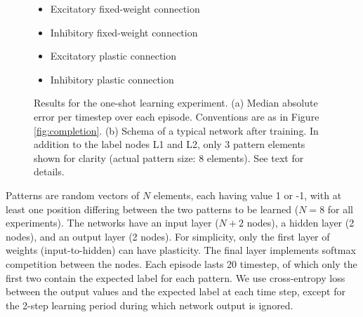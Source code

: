 \documentclass{article}
\begin{document}
\begin{figure}[b]
\begin{subfigure}[t]{0.4\textwidth}
\end{subfigure}
\begin{minipage}[b]{0.2\textwidth}
\noindent
\small
\begin{itemize}[leftmargin=*] %
\item[]\tikz{\path[very thick,->,draw=black] %
        (0,0) -- (1,0) ;}Excitatory fixed-weight connection
\item[]\tikz{\path[very thick,->,draw=blue] %
        (0,0) -- (1,0) ;}Inhibitory fixed-weight connection
\item[]\tikz{\path[very thick,->,dashed,draw=black] %
        (0,0) -- (1,0) ;}Excitatory plastic connection
\item[]\tikz{\path[very thick,->,dashed,draw=blue] %
        (0,0) -- (1,0) ;}Inhibitory plastic connection
\end{itemize}
\end{minipage}

\caption{Results for the one-shot learning experiment. (a) Median absolute error
    per timestep over each episode. Conventions are as in Figure
    \ref{fig:completion}.
(b) Schema of a
typical network after training. In addition to the label nodes L1 and L2, only 3 pattern elements shown for clarity (actual
pattern size: 8 elements). See text for details.}
\label{fig:oneshot}
\end{figure}

Patterns are random vectors of $N$ elements, each having
value 1 or -1, with at least one position differing between the two patterns to
be learned ($N=8$ for all experiments). The networks have an input layer ($N+2$ nodes), a hidden layer (2 nodes), and an
output layer (2 nodes). For simplicity, only the first layer of weights
(input-to-hidden) can have plasticity. The final layer implements softmax
competition between the nodes. Each episode lasts 20 timestep, of which only the first
two contain the expected label for each pattern. We use cross-entropy loss
between the output values and the expected label at each time step, except for
the 2-step learning period during which network output is ignored.
\end{document}
